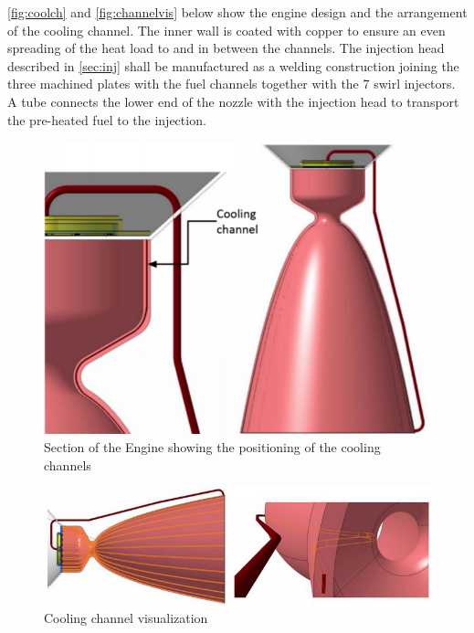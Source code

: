 \autoref{fig:coolch} and \autoref{fig:channelvis} below show the engine design and the arrangement of the cooling channel. The inner wall is coated with copper to ensure an even spreading of the heat load to and in between the channels. The injection head described in \autoref{sec:inj} shall be manufactured as a welding construction joining the three machined plates with the fuel channels together with the 7 swirl injectors. A tube
connects the lower end of the nozzle with the injection head to transport the pre-heated fuel to the
injection.

\begin{figure}[H]
	\centering
	\includegraphics[width=0.7\linewidth]{coolch}
	\caption{Section of the Engine showing the positioning of the cooling channels}\label{fig:coolch}
\end{figure}

\begin{figure}[H]
	\centering
	\includegraphics[width=0.7\linewidth]{channelvis}
	\caption{Cooling channel visualization}\label{fig:channelvis}
\end{figure}